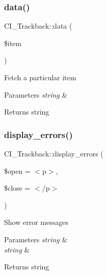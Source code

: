 \subsubsection{\texorpdfstring{data()}{data()}}
{\footnotesize\ttfamily C\+I\+\_\+\+Trackback\+::data (\begin{DoxyParamCaption}\item[{}]{\$item }\end{DoxyParamCaption})}

Fetch a particular item


\begin{DoxyParams}{Parameters}
{\em string} & \\
\hline
\end{DoxyParams}
\begin{DoxyReturn}{Returns}
string 
\end{DoxyReturn}
\mbox{\label{class_c_i___trackback_a88b31c54662c8de1bb9fd94357e0e557}} 
\subsubsection{\texorpdfstring{display\+\_\+errors()}{display\_errors()}}
{\footnotesize\ttfamily C\+I\+\_\+\+Trackback\+::display\+\_\+errors (\begin{DoxyParamCaption}\item[{}]{\$open = {\ttfamily \textquotesingle{}$<$p$>$\textquotesingle{}},  }\item[{}]{\$close = {\ttfamily \textquotesingle{}$<$/p$>$\textquotesingle{}} }\end{DoxyParamCaption})}

Show error messages


\begin{DoxyParams}{Parameters}
{\em string} & \\
\hline
{\em string} & \\
\hline
\end{DoxyParams}
\begin{DoxyReturn}{Returns}
string 
\end{DoxyReturn}
\mbox{\label{class_c_i___trackback_aed6543a51e490c9c6dbb982692f22ef1}} 
